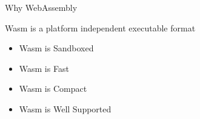 \documentclass[UTF8]{beamer}
\begin{document}
	\begin{frame}{Why WebAssembly}
		\begin{block}{}
		Wasm is a platform independent executable format
		\begin{itemize}
			\item Wasm is Sandboxed
			\item Wasm is Fast
			\item Wasm is Compact
			\item Wasm is Well Supported
		\end{itemize}
	\end{block}
	\end{frame}
\end{document}

